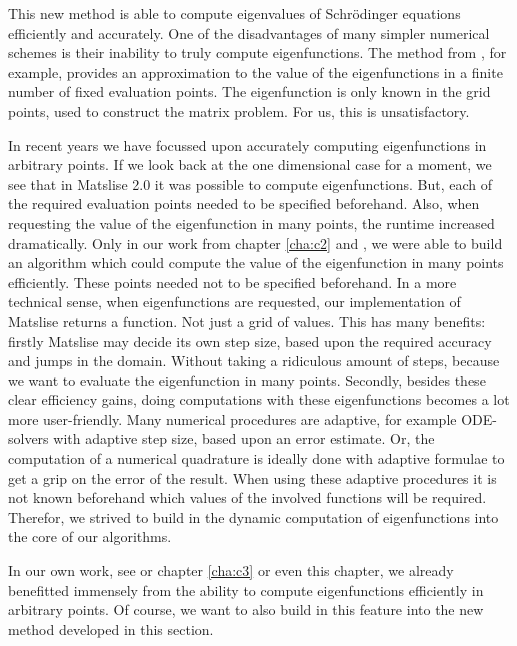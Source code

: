 This new method is able to compute eigenvalues of Schrödinger equations efficiently and accurately. One of the disadvantages of many simpler numerical schemes is their inability to truly compute eigenfunctions. The method from \cite{wang_new_2009}, for example, provides an approximation to the value of the eigenfunctions in a finite number of fixed evaluation points. The eigenfunction is only known in the grid points, used to construct the matrix problem. For us, this is unsatisfactory.

In recent years we have focussed upon accurately computing eigenfunctions in arbitrary points. If we look back at the one dimensional case for a moment, we see that in Matslise 2.0 \cite{ledoux_matslise_2016a} it was possible to compute eigenfunctions. But, each of the required evaluation points needed to be specified beforehand. Also, when requesting the value of the eigenfunction in many points, the runtime increased dramatically. Only in our work from chapter \ref{cha:c2} and \cite{baeyens_fast_2020}, we were able to build an algorithm which could compute the value of the eigenfunction in many points efficiently. These points needed not to be specified beforehand. In a more technical sense, when eigenfunctions are requested, our implementation of Matslise returns a function. Not just a grid of values. This has many benefits: firstly Matslise may decide its own step size, based upon the required accuracy and jumps in the domain. Without taking a ridiculous amount of steps, because we want to evaluate the eigenfunction in many points. Secondly, besides these clear efficiency gains, doing computations with these eigenfunctions becomes a lot more user-friendly. Many numerical procedures are adaptive, for example ODE-solvers with adaptive step size, based upon an error estimate. Or, the computation of a numerical quadrature is ideally done with adaptive formulae to get a grip on the error of the result. When using these adaptive procedures it is not known beforehand which values of the involved functions will be required. Therefor, we strived to build in the dynamic computation of eigenfunctions into the core of our algorithms.

In our own work, see \cite{baeyens_improvements_2022} or chapter \ref{cha:c3} or even this chapter, we already benefitted immensely from the ability to compute eigenfunctions efficiently in arbitrary points. Of course, we want to also build in this feature into the new method developed in this section.

